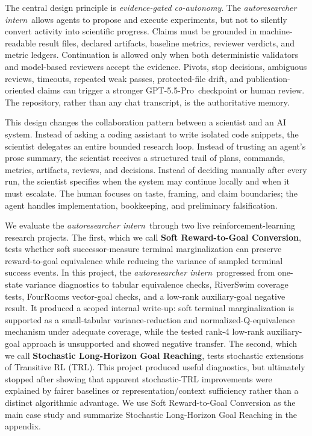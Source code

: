 \documentclass{article}
\newcommand{\intern}{\emph{autoresearcher intern}}
\newcommand{\gptpro}{GPT-5.5-Pro}
\begin{document}
The central design principle is \emph{evidence-gated co-autonomy}. The \intern\ allows agents to propose and execute experiments, but not to silently convert activity into scientific progress. Claims must be grounded in machine-readable result files, declared artifacts, baseline metrics, reviewer verdicts, and metric ledgers. Continuation is allowed only when both deterministic validators and model-based reviewers accept the evidence. Pivots, stop decisions, ambiguous reviews, timeouts, repeated weak passes, protected-file drift, and publication-oriented claims can trigger a stronger \gptpro\ checkpoint or human review. The repository, rather than any chat transcript, is the authoritative memory.

This design changes the collaboration pattern between a scientist and an AI system. Instead of asking a coding assistant to write isolated code snippets, the scientist delegates an entire bounded research loop. Instead of trusting an agent's prose summary, the scientist receives a structured trail of plans, commands, metrics, artifacts, reviews, and decisions. Instead of deciding manually after every run, the scientist specifies when the system may continue locally and when it must escalate. The human focuses on taste, framing, and claim boundaries; the agent handles implementation, bookkeeping, and preliminary falsification.

We evaluate the \intern\ through two live reinforcement-learning research projects. The first, which we call \textbf{Soft Reward-to-Goal Conversion}, tests whether soft successor-measure terminal marginalization can preserve reward-to-goal equivalence while reducing the variance of sampled terminal success events. In this project, the \intern\ progressed from one-state variance diagnostics to tabular equivalence checks, RiverSwim coverage tests, FourRooms vector-goal checks, and a low-rank auxiliary-goal negative result. It produced a scoped internal write-up: soft terminal marginalization is supported as a small-tabular variance-reduction and normalized-Q-equivalence mechanism under adequate coverage, while the tested rank-4 low-rank auxiliary-goal approach is unsupported and showed negative transfer. The second, which we call \textbf{Stochastic Long-Horizon Goal Reaching}, tests stochastic extensions of Transitive RL (TRL). This project produced useful diagnostics, but ultimately stopped after showing that apparent stochastic-TRL improvements were explained by fairer baselines or representation/context sufficiency rather than a distinct algorithmic advantage. We use Soft Reward-to-Goal Conversion as the main case study and summarize Stochastic Long-Horizon Goal Reaching in the appendix.
\end{document}
